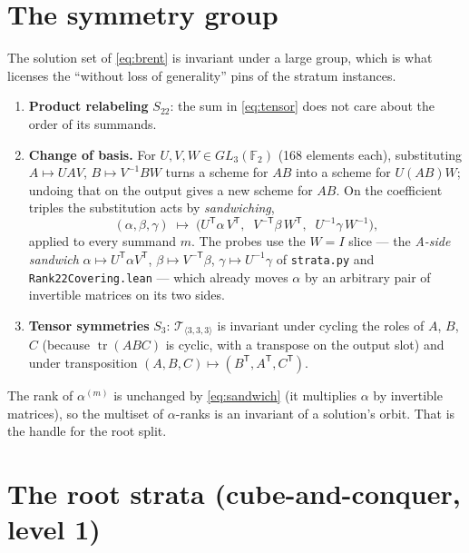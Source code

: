\documentclass[10pt]{article}
\newcommand{\F}{\mathbb F_2}
\newcommand{\T}{\mathcal T_{\langle 3,3,3\rangle}}
\newcommand{\tr}{^{\mathsf T}}
\newcommand{\al}[1]{\alpha^{(#1)}}
\begin{document}
\section{The symmetry group}

The solution set of \eqref{eq:brent} is invariant under a large group,
which is what licenses the ``without loss of generality'' pins of the
stratum instances.
\begin{enumerate}
\item \textbf{Product relabeling} $S_{22}$: the sum in
  \eqref{eq:tensor} does not care about the order of its summands.
\item \textbf{Change of basis.} For $U,V,W\in GL_3(\F)$ (168 elements
  each), substituting $A\mapsto UAV$, $B\mapsto V^{-1}BW$ turns a scheme
  for $AB$ into a scheme for $U(AB)W$; undoing that on the output gives
  a new scheme for $AB$. On the coefficient triples the substitution
  acts by \emph{sandwiching},
  \begin{equation}\label{eq:sandwich}
    (\alpha,\beta,\gamma)\;\longmapsto\;
    \big(U\tr\alpha\,V\tr,\;\; V^{-\mathsf T}\beta\,W\tr,\;\; U^{-1}\gamma\,W^{-1}\big),
  \end{equation}
  applied to every summand $m$. The probes use the $W=I$ slice --- the
  \emph{A-side sandwich} $\alpha\mapsto U\tr\alpha V\tr$,
  $\beta\mapsto V^{-\mathsf T}\beta$, $\gamma\mapsto U^{-1}\gamma$ of
  \texttt{strata.py} and \texttt{Rank22Covering.lean} --- which already
  moves $\alpha$ by an arbitrary pair of invertible matrices on its two
  sides.
\item \textbf{Tensor symmetries} $S_3$: $\T$ is invariant under cycling
  the roles of $A$, $B$, $C$ (because $\operatorname{tr}(ABC)$ is cyclic,
  with a transpose on the output slot) and under transposition
  $(A,B,C)\mapsto(B\tr,A\tr,C\tr)$.
\end{enumerate}
The rank of $\al{m}$ is unchanged by \eqref{eq:sandwich} (it multiplies
$\alpha$ by invertible matrices), so the multiset of $\alpha$-ranks is an
invariant of a solution's orbit. That is the handle for the root split.

\section{The root strata (cube-and-conquer, level 1)}
\end{document}
